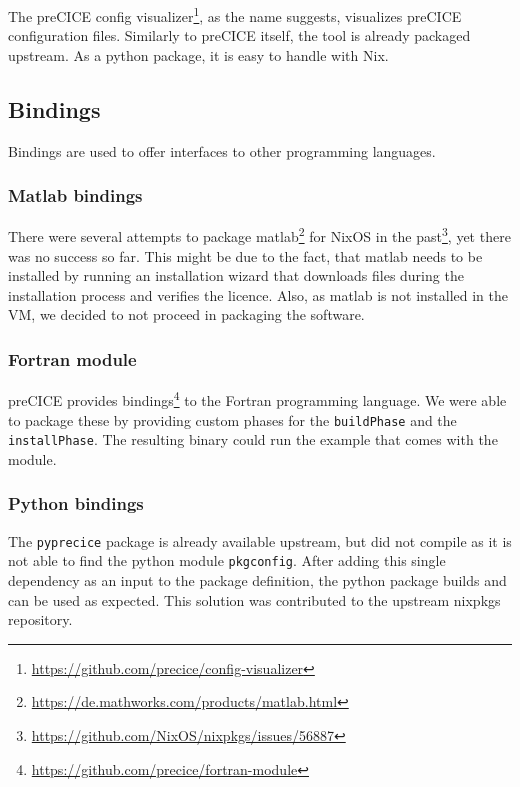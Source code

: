 \documentclass{eceasst}
\begin{document}
The preCICE config visualizer\footnote{\url{https://github.com/precice/config-visualizer}}, as the name suggests, visualizes preCICE configuration files. Similarly to preCICE itself, the tool is already packaged upstream.
As a python package, it is easy to handle with Nix.

\subsection{Bindings}

Bindings are used to offer interfaces to other programming languages.

\subsubsection{Matlab bindings}

There were several attempts to package matlab\footnote{\url{https://de.mathworks.com/products/matlab.html}} for NixOS in the past\footnote{\url{https://github.com/NixOS/nixpkgs/issues/56887}}, yet there was no success so far.
This might be due to the fact, that matlab needs to be installed by running an installation wizard that downloads files during the installation process and verifies the licence.
Also, as matlab is not installed in the VM, we decided to not proceed in packaging the software.

\subsubsection{Fortran module}

preCICE provides bindings\footnote{\url{https://github.com/precice/fortran-module}} to the Fortran programming language.
We were able to package these by providing custom phases for the \texttt{buildPhase} and the \texttt{installPhase}.
The resulting binary could run the example that comes with the module.

\subsubsection{Python bindings}

The \texttt{pyprecice} package is already available upstream, but did not compile as it is not able to find the python module \texttt{pkgconfig}.
After adding this single dependency as an input to the package definition, the python package builds and can be used as expected.
This solution was contributed to the upstream nixpkgs repository.
\end{document}

